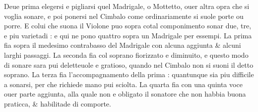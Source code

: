 Deue prima elegersi e pigliarsi quel Madrigale, o Mottetto, ouer altra opra che si voglia sonare, e poi ponersi nel Cimbalo come ordinariamente si suole \b{porte ou porre}. E colui che suona il Violone puo sopra cotal componimento sonar due, tre, e piu varietadi : e qui ne pono quattro sopra un Madrigale per essempi. La prima fia sopra il medesimo contrabasso del Madrigale con alcuna aggiunta \& alcuni larghi passaggi. La seconda fia col soprano fiorizzato e diminuito, e questo modo di sonare sara pui deletteuole e gratioso, quando nel Cimbalo non si suoni il detto soprano. La terza fia l'accompagnamento della prima : quantunque sia piu difficile a sonarsi, per che richiede mano pui sciolta. La quarta fia con una quinta voce ouer parte aggiunta, alla quale non e obligato il sonatore che non habbia buona praticca, \& habilitade di comporte.
